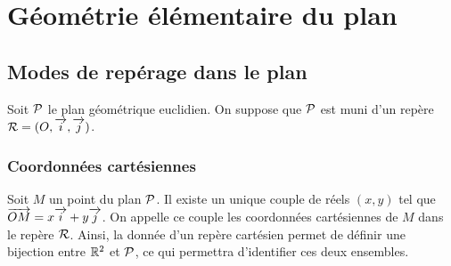\chapter{Géométrie élémentaire du plan}
\label{chap:geomplan}
\minitoc
\minilof
\minilot
\section{Modes de repérage dans le plan}
\label{sec:modederep}
Soit \(\P\) le plan géométrique euclidien. On suppose que \(\P\) est muni d'un repère \(\Rep=(O,\vi, \vj)\).
%
\subsection{Coordonnées cartésiennes}
\label{subsec:coordcart}
\begin{defdef}
  Soit \(M\) un point du plan \(\P\). Il existe un unique couple de réels \((x,y)\) tel que \(\vect{OM}=x\vi+y\vj\). On appelle ce couple les coordonnées cartésiennes de \(M\) dans le repère \(\Rep\). Ainsi, la donnée d'un repère cartésien permet de définir une bijection entre \(\R^2\) et \(\P\), ce qui permettra d'identifier ces deux ensembles. %
\end{defdef}
%
